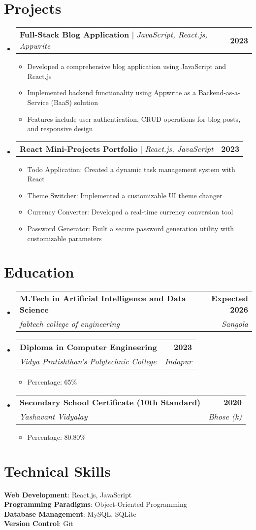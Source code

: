 \documentclass[a4paper,11pt]{article}
\makeatletter
\newcommand{\resumeItem}[1]{
  \item\small{
    {#1 \vspace{-2pt}}
  }
}
\newcommand{\resumeSubheading}[4]{
  \vspace{-2pt}\item
    \begin{tabular*}{1.0\textwidth}[t]{l@{\extracolsep{\fill}}r}
      \textbf{#1} & \textbf{\small #2} \\
      \textit{\small#3} & \textit{\small #4} \\
    \end{tabular*}\vspace{-7pt}
}
\newcommand{\resumeProjectHeading}[2]{
    \item
    \begin{tabular*}{1.001\textwidth}{l@{\extracolsep{\fill}}r}
      \small#1 & \textbf{\small #2}\\
    \end{tabular*}\vspace{-7pt}
}
\newcommand{\resumeSubHeadingListStart}{\begin{itemize}[leftmargin=0.0in, label={}]}
\newcommand{\resumeSubHeadingListEnd}{\end{itemize}}
\newcommand{\resumeItemListStart}{\begin{itemize}}
\newcommand{\resumeItemListEnd}{\end{itemize}\vspace{-5pt}}
\makeatother
\begin{document}
\section{Projects}
\resumeSubHeadingListStart
    \resumeProjectHeading
    {\textbf{Full-Stack Blog Application} $|$ \emph{JavaScript, React.js, Appwrite}}{2023}
    \resumeItemListStart
        \resumeItem{Developed a comprehensive blog application using JavaScript and React.js}
        \resumeItem{Implemented backend functionality using Appwrite as a Backend-as-a-Service (BaaS) solution}
        \resumeItem{Features include user authentication, CRUD operations for blog posts, and responsive design}
    \resumeItemListEnd
    \resumeProjectHeading
    {\textbf{React Mini-Projects Portfolio} $|$ \emph{React.js, JavaScript}}{2023}
    \resumeItemListStart
        \resumeItem{Todo Application: Created a dynamic task management system with React}
        \resumeItem{Theme Switcher: Implemented a customizable UI theme changer}
        \resumeItem{Currency Converter: Developed a real-time currency conversion tool}
        \resumeItem{Password Generator: Built a secure password generation utility with customizable parameters}
    \resumeItemListEnd
\resumeSubHeadingListEnd

\section{Education}
\resumeSubHeadingListStart
    \resumeSubheading
    {M.Tech in Artificial Intelligence and Data Science}{Expected 2026}
    {fabtech college of engineering}{Sangola}
    \resumeSubheading
    {Diploma in Computer Engineering}{2023}
    {Vidya Pratishthan's Polytechnic College}{Indapur}
    \resumeItemListStart
        \resumeItem{Percentage: 65\%}
    \resumeItemListEnd
    \resumeSubheading
    {Secondary School Certificate (10th Standard)}{2020}
    {Yashavant Vidyalay}{Bhose (k)}
    \resumeItemListStart
        \resumeItem{Percentage: 80.80\%}
    \resumeItemListEnd
\resumeSubHeadingListEnd

\section{Technical Skills}
\begin{itemize}[leftmargin=0.15in, label={}]
    \small{\item{
    \textbf{Web Development}{: React.js, JavaScript} \\
    \textbf{Programming Paradigms}{: Object-Oriented Programming} \\
    \textbf{Database Management}{: MySQL, SQLite} \\
    \textbf{Version Control}{: Git}
    }}
\end{itemize}
\end{document}
